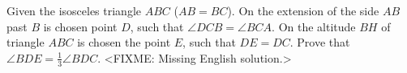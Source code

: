 \problem{}
Given the isosceles triangle $ABC$ ($AB = BC$).
On the extension of the side $AB$ past $B$ is chosen point $D$, such that $\angle DCB = \angle BCA$.
On the altitude $BH$ of triangle $ABC$ is chosen the point $E$, such that $DE = DC$.
Prove that $\angle BDE = \frac{1}{3}\angle BDC$.
\solution
<FIXME: Missing English solution.>
\endproblem
